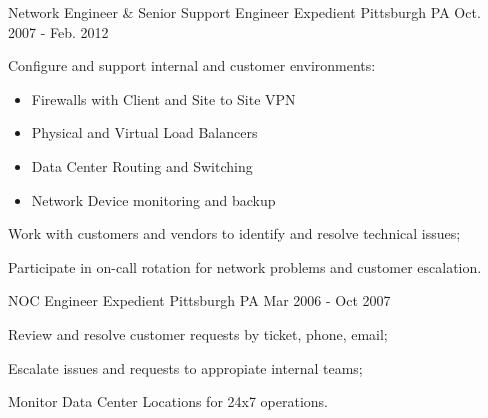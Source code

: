 \begin{cventries}

\cventry
{Network Engineer \& Senior Support Engineer} %
{Expedient} %
{Pittsburgh PA} %
{Oct. 2007 - Feb. 2012} %
{ %
\begin{cvitems}
\item Configure and support internal and customer environments:
  \begin{itemize}%
  \item Firewalls with Client and Site to Site VPN
  \item Physical and Virtual Load Balancers
  \item Data Center Routing and Switching
  \item Network Device monitoring and backup
  \end{itemize}
\item Work with customers and vendors to identify and resolve technical issues;
\item Participate in on-call rotation for network problems and customer escalation.
\end{cvitems} 
}


\cventry
{NOC Engineer} %
{Expedient} %
{Pittsburgh PA} %
{Mar 2006 - Oct 2007} %
{ %
\begin{cvitems}
\item Review and resolve customer requests by ticket, phone, email;
\item Escalate issues and requests to appropiate internal teams;
\item Monitor Data Center Locations for 24x7 operations.
\end{cvitems}
}

\end{cventries}
